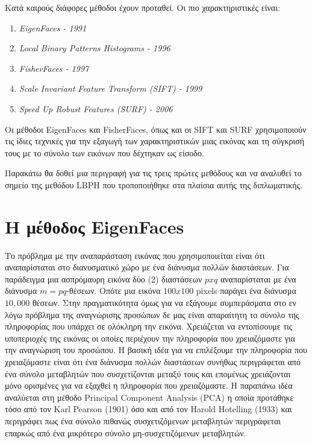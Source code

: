 Κατά καιρούς διάφορες μέθοδοι έχουν προταθεί. Οι πιο χαρακτηριστικές είναι:

\begin{enumerate}
  \item \emph{EigenFaces - 1991 ~\cite{Turk:1991:ER:1326887.1326894}}
  \item \emph{Local Binary Patterns Histograms - 1996 ~\cite{10.1007/978-3-540-24670-1_36}}
  \item \emph{FisherFaces - 1997 ~\cite{behekri97}}
  \item \emph{Scale Invariant Feature Transform (SIFT) - 1999 ~\cite{790410}}
  \item \emph{Speed Up Robust Features (SURF) - 2006 ~\cite{BAY2008346}}
\end{enumerate}

Οι μέθοδοι EigenFaces και FisherFaces, όπως και οι SIFT και SURF χρησιμοποιούν
τις ίδιες τεχνικές για την εξαγωγή των χαρακτηριστικών μιας εικόνας και τη σύγκρισή
τους με το σύνολο των εικόνων που δέχτηκαν ως είσοδο.

Παρακάτω θα δοθεί μια περιγραφή για τις τρεις πρώτες μεθόδους και να αναλυθεί
το σημείο της μεθόδου LBPH που τροποποιήθηκε στα πλαίσια αυτής της διπλωματικής.


\section{H μέθοδος EigenFaces}\label{sec:eigen}

Το πρόβλημα με την αναπαράσταση εικόνας που χρησιμοποιείται είναι ότι αναπαρίσταται
στο διανυσματικό χώρο με ένα διάνυσμα πολλών διαστάσεων. Για παράδειγμα μια ασπρόμαυρη
εικόνα δύο (2) διαστάσεων $p x q$ αναπαρίσταται με ένα διάνυσμα $m=pq$-θέσεων.
Οπότε μια εικόνα $100 x 100$ pixels παράγει ένα διάνυσμα $10,000$ θέσεων.
Στην πραγματικότητα όμως για να εξάγουμε συμπεράσματα στο εν λόγω πρόβλημα της
αναγνώρισης προσώπων δε μας είναι απαραίτητη το σύνολο της πληροφορίας που υπάρχει
σε ολόκληρη την εικόνα. Χρειάζεται να εντοπίσουμε τις υποπεριοχές της
εικόνας οι οποίες περιέχουν την πληροφορία που χρειαζόμαστε για την αναγνώριση
του προσώπου. Η βασική ιδέα για να επιλέξουμε την πληροφορία που χρειαζόμαστε είναι
ότι ένα διάνυσμα πολλών διαστάσεων συνήθως περιγράφεται από ένα σύνολο μεταβλητών
που συσχετίζονται μεταξύ τους και επομένως χρειάζονται μόνο ορισμένες για να εξαχθεί
η πληροφορία που χρειαζόμαστε. Η παραπάνω ιδέα αναλύεται στη μέθοδο
Principal Component Analysis (PCA) η οποία προτάθηκε τόσο από τον Karl Pearson
 (1901) όσο και από τον
Harold Hotelling  (1933) και περιγράφει
πως ένα σύνολο πιθανώς συσχετιζόμενων μεταβλητών περιγράφεται επαρκώς από ένα
μικρότερο σύνολο μη-συσχετιζόμενων μεταβλητών.

